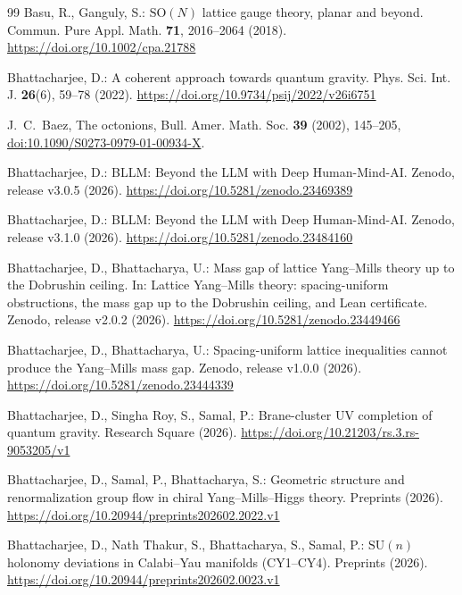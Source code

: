 \documentclass[11pt]{amsart}
\theoremstyle{definition}
\theoremstyle{remark}
\numberwithin{equation}{section}
\newcommand{\SU}{\mathrm{SU}}
\newcommand{\SO}{\mathrm{SO}}
\begin{document}
\begin{thebibliography}{99}
Basu, R., Ganguly, S.: $\SO(N)$ lattice gauge theory, planar and beyond. Commun. Pure Appl. Math. \textbf{71}, 2016--2064 (2018). \href{https://doi.org/10.1002/cpa.21788}{https://doi.org/10.1002/cpa.21788}

Bhattacharjee, D.: A coherent approach towards quantum gravity. Phys. Sci. Int. J. \textbf{26}(6), 59--78 (2022). \href{https://doi.org/10.9734/psij/2022/v26i6751}{https://doi.org/10.9734/psij/2022/v26i6751}

J.~C.~Baez, The octonions, Bull. Amer. Math. Soc. \textbf{39} (2002),
145--205,
\href{https://doi.org/10.1090/S0273-0979-01-00934-X}{doi:10.1090/S0273-0979-01-00934-X}.

Bhattacharjee, D.: BLLM: Beyond the LLM with Deep Human-Mind-AI. Zenodo,
release v3.0.5 (2026).
\href{https://doi.org/10.5281/zenodo.23469389}{https://doi.org/10.5281/zenodo.23469389}

Bhattacharjee, D.: BLLM: Beyond the LLM with Deep Human-Mind-AI. Zenodo,
release v3.1.0 (2026).
\href{https://doi.org/10.5281/zenodo.23484160}{https://doi.org/10.5281/zenodo.23484160}

Bhattacharjee, D., Bhattacharya, U.: Mass gap of lattice Yang--Mills
theory up to the Dobrushin ceiling. In: Lattice Yang--Mills theory:
spacing-uniform obstructions, the mass gap up to the Dobrushin ceiling, and
Lean certificate. Zenodo, release v2.0.2 (2026).
\href{https://doi.org/10.5281/zenodo.23449466}{https://doi.org/10.5281/zenodo.23449466}

Bhattacharjee, D., Bhattacharya, U.: Spacing-uniform lattice inequalities
cannot produce the Yang--Mills mass gap. Zenodo, release v1.0.0 (2026).
\href{https://doi.org/10.5281/zenodo.23444339}{https://doi.org/10.5281/zenodo.23444339}

Bhattacharjee, D., Singha Roy, S., Samal, P.: Brane-cluster UV completion of quantum gravity. Research Square (2026). \href{https://doi.org/10.21203/rs.3.rs-9053205/v1}{https://doi.org/10.21203/rs.3.rs-9053205/v1}

Bhattacharjee, D., Samal, P., Bhattacharya, S.: Geometric structure and
renormalization group flow in chiral Yang--Mills--Higgs theory. Preprints
(2026).
\href{https://doi.org/10.20944/preprints202602.2022.v1}{https://doi.org/10.20944/preprints202602.2022.v1}

Bhattacharjee, D., Nath Thakur, S., Bhattacharya, S., Samal, P.: $\SU(n)$ holonomy deviations in Calabi--Yau manifolds (CY1--CY4). Preprints (2026). \href{https://doi.org/10.20944/preprints202602.0023.v1}{https://doi.org/10.20944/preprints202602.0023.v1}


\end{thebibliography}
\end{document}
